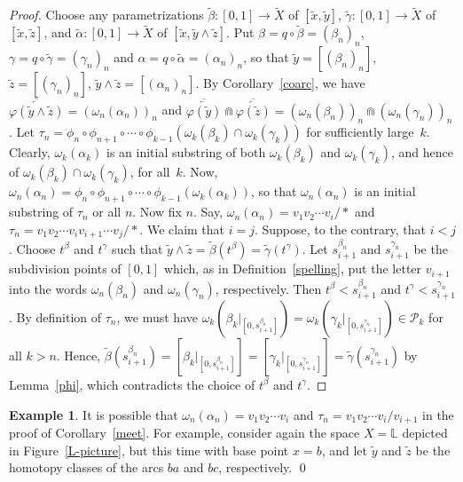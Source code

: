 \documentclass{amsart}
\theoremstyle{definition}
\newtheorem{example}[theorem]{Example}
\theoremstyle{remark}
\numberwithin{equation}{section}
\begin{document}
\begin{proof}
Choose any parametrizations $\tilde{\beta}:[0,1]\rightarrow \tilde{X}$ of $[\tilde{x},\tilde{y}]$,  $\tilde{\gamma}:[0,1]\rightarrow \tilde{X}$  of $[\tilde{x},\tilde{z}]$, and  $\tilde{\alpha}:[0,1]\rightarrow \tilde{X}$ of $[\tilde{x},\tilde{y}\wedge\tilde{z}]$.
 Put  $\beta=q\circ \tilde{\beta}=(\beta_n)_n$, $\gamma=q\circ \tilde{\gamma}=(\gamma_n)_n$ and $\alpha=q\circ \tilde{\alpha}=(\alpha_n)_n$,
  so that $\tilde{y}=[(\beta_n)_n]$,  $\tilde{z}=[(\gamma_n)_n]$, $\tilde{y}\wedge \tilde{z}=[(\alpha_n)_n]$. By Corollary~\ref{coarc}, we have $\overline{\overleftarrow{\varphi(\tilde{y}\wedge\tilde{z})}}=(\omega_n(\alpha_n))_n$ and $\overline{\overleftarrow{\varphi(\tilde{y})}}\Cap \overline{\overleftarrow{\varphi(\tilde{z})}}=(\omega_n(\beta_n))_n\Cap (\omega_n(\gamma_n))_n$.
 Let $\tau_n=\phi_n\circ\phi_{n+1}\circ \cdots\circ \phi_{k-1}(\omega_{k}(\beta_k)\cap \omega_{k}(\gamma_k))$ for sufficiently large~$k$. Clearly, $\omega_k(\alpha_k)$ is  an initial substring of both $\omega_k(\beta_k)$ and $\omega_k(\gamma_k)$, and hence of $\omega_k(\beta_k)\cap\omega_k(\gamma_k)$, for all~$k$. Now, $\omega_n(\alpha_n)=\phi_n\circ\phi_{n+1}\circ \cdots\circ \phi_{k-1}(\omega_k(\alpha_k))$, so that $\omega_n(\alpha_n)$ is an initial substring of $\tau_n$ or all $n$. Now fix $n$.
Say, $\omega_n(\alpha_n)=v_1v_2\cdots v_i/\ast$ and $\tau_n=v_1v_2\cdots v_iv_{i+1}\cdots v_j/\ast$. We claim that $i=j$. Suppose, to the contrary, that $i<j$.
Choose $t^\beta$ and $t^\gamma$ such that $\tilde{y}\wedge \tilde{z}=\tilde{\beta}(t^{\beta})=\tilde{\gamma}(t^\gamma)$.
Let $s^{\beta_n}_{i+1}$ and $s^{\gamma_n}_{i+1}$ be the subdivision points of $[0,1]$ which, as in Definition~\ref{spelling}, put the letter $v_{i+1}$ into the words $\omega_n(\beta_n)$ and $\omega_n(\gamma_n)$, respectively. Then $t^\beta<s^{\beta_n}_{i+1}$ and $t^\gamma<s^{\gamma_n}_{i+1}$.
 By definition of $\tau_n$, we must have $\omega_k(\beta_k|_{[0,s^{\beta_n}_{i+1}]})=\omega_k(\gamma_k|_{[0,s^{\gamma_n}_{i+1}]})\in {\mathcal P}_k$ for all $k>n$. Hence, $\tilde{\beta}(s^{\beta_n}_{i+1})=[\beta_k|_{[0,s^{\beta_n}_{i+1}]}]=[\gamma_k|_{[0,s^{\gamma_n}_{i+1}]}]=\tilde{\gamma}(s^{\gamma_n}_{i+1})$ by Lemma~\ref{phi}, which contradicts the choice of $t^\beta$ and $t^\gamma$.
\end{proof}

\begin{example} It is possible that  $\omega_n(\alpha_n)=v_1v_2\cdots v_i$ and $\tau_n=v_1v_2\cdots v_i/v_{i+1}$ in the proof of Corollary~\ref{meet}.
 For example, consider again the space $X=\mathbb{L}$ depicted in Figure~\ref{L-picture}, but this time with base point $x=b$, and let $\tilde{y}$ and $\tilde{z}$ be the homotopy classes of the arcs $ba$ and $bc$, respectively. \qed
\end{example}
\end{document}
